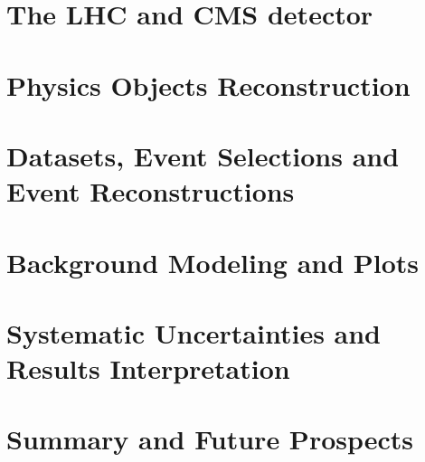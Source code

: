 \documentclass[14pt,a4paper,oldfontcommands]{memoir}
\begin{document}
\chapter{The LHC and CMS detector}

\chapter{Physics Objects Reconstruction}

\chapter{Datasets, Event Selections and Event Reconstructions}


\chapter{Background Modeling and Plots}

\chapter{Systematic Uncertainties and Results Interpretation}

\chapter{Summary and Future Prospects}





\end{document}
